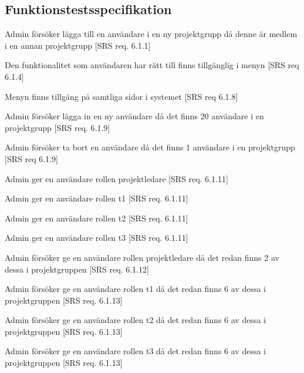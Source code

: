 \documentclass[a4paper]{article}
\begin{document}
\newpage

\begin{appendices}

\section{Funktionstestsspecifikation}


\begin{FT}


\item
Admin försöker lägga till en användare i en ny projektgrupp då denne är medlem i en annan projektgrupp [SRS req. 6.1.1]

\item
Den funktionalitet som användaren har rätt till finns tillgänglig i menyn [SRS req 6.1.4]

\item
Menyn finns tillgäng på samtliga sidor i systemet [SRS req 6.1.8]

\item
Admin försöker lägga in en ny användare då det finns 20 användare i en projektgrupp [SRS req. 6.1.9]

\item
Admin försöker ta bort en användare då det finns 1 användare i en projektgrupp [SRS req 6.1.9]

\item
Admin ger en användare rollen projektledare [SRS req. 6.1.11]

\item
Admin ger en användare rollen t1 [SRS req. 6.1.11]

\item
Admin ger en användare rollen t2 [SRS req. 6.1.11]

\item
Admin ger en användare rollen t3 [SRS req. 6.1.11]

\item
Admin försöker ge en användare rollen projektledare då det redan finns 2 av dessa i projektgruppen [SRS req. 6.1.12]

\item
Admin försöker ge en användare rollen t1 då det redan finns 6 av dessa i projektgruppen [SRS req. 6.1.13]

\item
Admin försöker ge en användare rollen t2 då det redan finns 6 av dessa i projektgruppen [SRS req. 6.1.13]

\item
Admin försöker ge en användare rollen t3 då det redan finns 6 av dessa i projektgruppen [SRS req. 6.1.13]


\end{FT}
\end{appendices}
\end{document}
